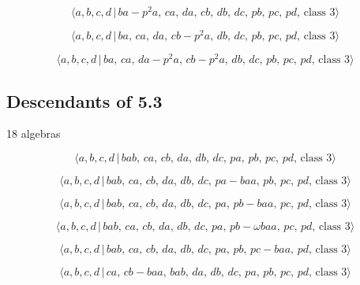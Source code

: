 \documentclass[10pt]{article}
\begin{document}
\begin{equation}
\langle a,b,c,d\,|\,ba-p^2a,\,ca,\,da,\,cb,\,db,\,dc,\,pb,\,pc,\,pd,\,\text{
class }3\rangle  \tag{6.64}
\end{equation}

\begin{equation}
\langle a,b,c,d\,|\,ba,\,ca,\,da,\,cb-p^2a,\,db,\,dc,\,pb,\,pc,\,pd,\,\text{
class }3\rangle  \tag{6.65}
\end{equation}

\begin{equation}
\langle a,b,c,d\,|\,ba,\,ca,\,da-p^2a,\,cb-p^2a,\,db,\,dc,\,pb,\,pc,\,pd,\,%
\text{class }3\rangle  \tag{6.66}
\end{equation}

\subsection{Descendants of 5.3}

18 algebras

\begin{equation}
\langle a,b,c,d\,|\,bab,\,ca,\,cb,\,da,\,db,\,dc,\,pa,\,pb,\,pc,\,pd,\,\text{
class }3\rangle  \tag{6.67}
\end{equation}

\begin{equation}
\langle a,b,c,d\,|\,bab,\,ca,\,cb,\,da,\,db,\,dc,\,pa-baa,\,pb,\,pc,\,pd,\,%
\text{class }3\rangle  \tag{6.68}
\end{equation}

\begin{equation}
\langle a,b,c,d\,|\,bab,\,ca,\,cb,\,da,\,db,\,dc,\,pa,\,pb-baa,\,pc,\,pd,\,%
\text{class }3\rangle  \tag{6.69}
\end{equation}

\begin{equation}
\langle a,b,c,d\,|\,bab,\,ca,\,cb,\,da,\,db,\,dc,\,pa,\,pb-\omega
baa,\,pc,\,pd,\,\text{class }3\rangle  \tag{6.70}
\end{equation}

\begin{equation}
\langle a,b,c,d\,|\,bab,\,ca,\,cb,\,da,\,db,\,dc,\,pa,\,pb,\,pc-baa,\,pd,\,%
\text{class }3\rangle  \tag{6.71}
\end{equation}

\begin{equation}
\langle a,b,c,d\,|\,ca,\,cb-baa,\,bab,\,da,\,db,\,dc,\,pa,\,pb,\,pc,\,pd,\,%
\text{class }3\rangle  \tag{6.72}
\end{equation}
\end{document}
